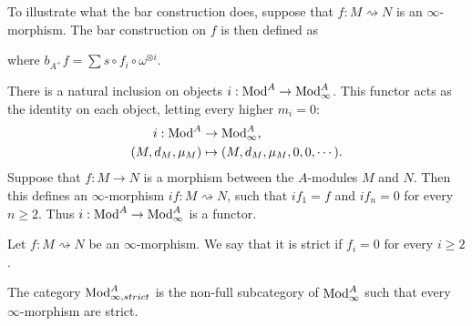\documentclass[../thesis.tex]{subfiles}
\begin{document}
            To illustrate what the bar construction does, suppose that $f : M \rightsquigarrow N$ is an $\infty$-morphism. The bar construction on $f$ is then defined as
            \begin{center}
            \end{center}
            where $b_{A^+}f = \sum s \circ f_i \circ \omega^{\otimes i}$.

            There is a natural inclusion on objects $i : \tt{Mod}^A \rightarrow \tt{Mod}_\infty^A$. This functor acts as the identity on each object, letting every higher $m_i = 0$:
            \begin{align*}
                i : \tt{Mod}^A & \rightarrow \tt{Mod}_\infty^A\tt{,}\\
                (M, d_M, \mu_M) & \mapsto (M, d_M, \mu_M, 0, 0, \cdots)\tt{.}
            \end{align*}
            Suppose that $f : M \rightarrow N$ is a morphism between the $A$-modules $M$ and $N$. Then this defines an $\infty$-morphism $if : M \rightsquigarrow N$, such that $if_1 = f$ and $if_n = 0$ for every $n \geq 2$. Thus $i : \tt{Mod}^A \rightarrow \tt{Mod}_\infty^A$ is a functor.
            
            \begin{definition}
                Let $f : M \rightsquigarrow N$ be an $\infty$-morphism. We say that it is strict if $f_i = 0$ for every $i \geq 2$.
            \end{definition}

            The category $\tt{Mod}_{\infty, strict}^A$ is the non-full subcategory of $\tt{Mod}_{\infty}^A$ such that every $\infty$-morphism are strict. 
            
\end{document}
